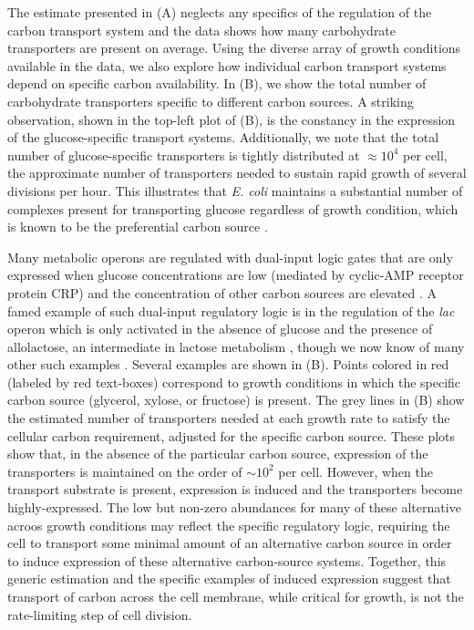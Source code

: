 The estimate presented in (A) neglects any specifics of the
regulation of the carbon transport system and the data shows how many
carbohydrate transporters are present on average. Using the diverse array of
growth conditions available in the data, we also explore how individual carbon
transport systems depend on specific carbon availability. In
(B), we show the total number of carbohydrate transporters
specific to different carbon sources. A striking observation, shown in the
top-left plot of (B), is the constancy in the expression of
the glucose-specific transport systems. Additionally, we note that the total
number of glucose-specific transporters is tightly distributed at $\approx 10^4$
per cell, the approximate number of transporters needed to sustain rapid growth
of several divisions per hour. This illustrates that \textit{E. coli} maintains
a substantial number of complexes present for transporting glucose regardless of
growth condition, which is known to be the preferential carbon source
\citep{monod1947, liu2005a, aidelberg2014}.

Many metabolic operons are regulated with dual-input logic gates that are only
expressed when glucose concentrations are low (mediated by cyclic-AMP receptor
protein CRP) and the concentration of other carbon sources are elevated
\citep{gama-castro2016, zhang2014a}. A famed example of such dual-input
regulatory logic is in the regulation of the \textit{lac} operon which is only
activated in the absence of glucose and the presence of allolactose, an
intermediate in lactose metabolism \citep{jacob1961}, though we now know of many
other such examples \citep{ireland2020, gama-castro2016, belliveau2018}.
Several examples are shown in (B). Points colored in red
(labeled by red text-boxes) correspond to growth conditions in which the
specific carbon source (glycerol, xylose, or fructose) is present. The grey
lines in (B) show the estimated number of transporters needed
at each growth rate to satisfy the cellular carbon requirement, adjusted for the
specific carbon source. These plots show that, in the absence of the particular
carbon source, expression of the transporters is maintained on the order of
$\sim 10^2$ per cell. However, when the transport substrate is present,
expression is induced and the transporters become highly-expressed. The low but
non-zero abundances for many  of these alternative acroos growth conditions may
reflect the specific regulatory logic, requiring the cell to transport some
minimal  amount of an alternative carbon source in order to induce expression
of these alternative carbon-source systems.
Together, this generic estimation and the specific examples of induced
expression suggest that transport of carbon across the cell membrane, while
critical for growth, is not the rate-limiting step of cell division.

